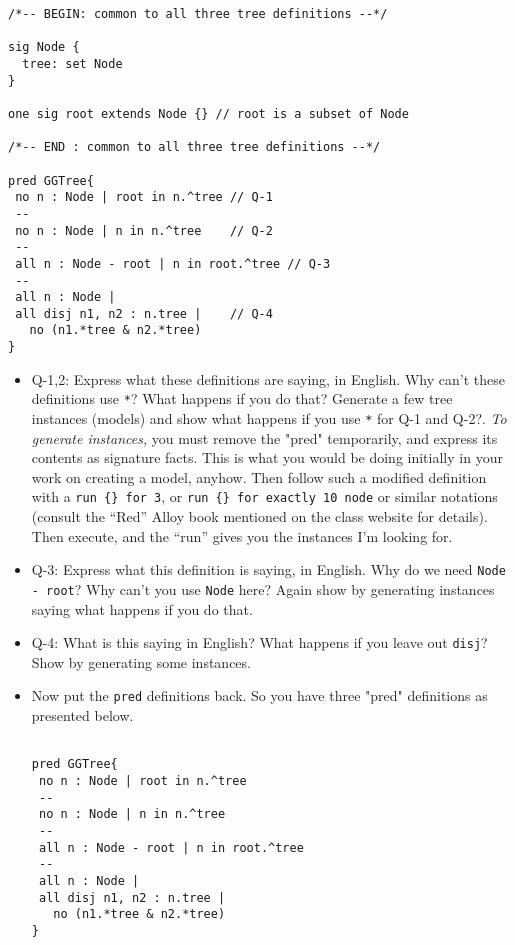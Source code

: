 \documentclass[11pt]{article}
\begin{document}
\begin{enumerate}
\begin{scriptsize}
\begin{verbatim}
/*-- BEGIN: common to all three tree definitions --*/

sig Node {
  tree: set Node
}

one sig root extends Node {} // root is a subset of Node

/*-- END : common to all three tree definitions --*/

pred GGTree{
 no n : Node | root in n.^tree // Q-1
 --
 no n : Node | n in n.^tree    // Q-2
 --
 all n : Node - root | n in root.^tree // Q-3
 -- 
 all n : Node |
 all disj n1, n2 : n.tree |    // Q-4
   no (n1.*tree & n2.*tree) 
}
  \end{verbatim}
  \end{scriptsize}

\begin{itemize}
\item[] Q-1,2: Express what these definitions are saying, in English.
Why can't these definitions use \verb|*|? What happens if you do that?
 Generate
a few tree instances (models) and show what happens if you use \verb|*| for Q-1 and Q-2?.
%
{\em To generate instances,} you must remove the "pred" temporarily, and express its
contents as signature facts.
This is what you would be doing initially in your work on creating a model, anyhow.
Then follow such a modified definition with a
\verb|run {} for 3|,
or
\verb|run {} for exactly 10 node|
or
similar notations (consult the ``Red'' Alloy book mentioned on the class website for details).
Then execute, and the ``run'' gives you the instances I'm looking for.

\item[] Q-3: Express what this definition is saying, in English.
Why do we need \verb|Node - root|? Why can't you use \verb|Node| here?
Again show by generating instances saying what happens if you do that.

\item[] Q-4: What is this saying in English?
What happens if you leave out \verb|disj|?
Show by generating some instances.

\item Now put the {\tt pred} definitions back. So you have three "pred" definitions as presented below.

\begin{scriptsize}
\begin{verbatim}

pred GGTree{
 no n : Node | root in n.^tree
 --
 no n : Node | n in n.^tree
 --
 all n : Node - root | n in root.^tree
 -- 
 all n : Node |
 all disj n1, n2 : n.tree |  
   no (n1.*tree & n2.*tree) 
}



\end{verbatim}
\end{scriptsize}
\end{itemize}
\end{enumerate}
\end{document}

